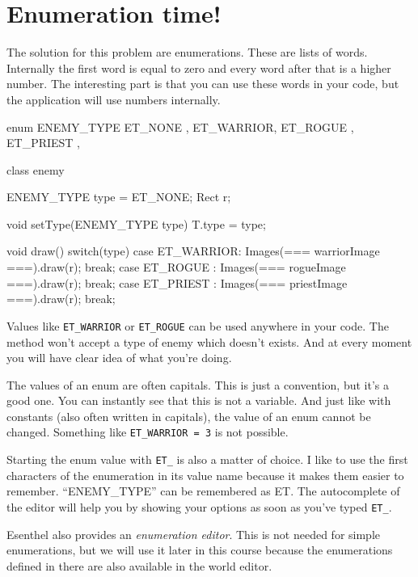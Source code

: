 \section{Enumeration time!}
The solution for this problem are enumerations. These are lists of words. Internally the first word is equal to zero and every word after that is a higher number. The interesting part is that you can use these words in your code, but the application will use numbers internally.

\begin{code}
enum ENEMY_TYPE {
  ET_NONE   ,
  ET_WARRIOR,
  ET_ROGUE  ,
  ET_PRIEST , 
}

class enemy {
  ENEMY_TYPE type = ET_NONE;
	Rect r;
	
	void setType(ENEMY_TYPE type) {
		T.type = type;
	}
	
	void draw() {
		switch(type) {
			case ET_WARRIOR: Images(=== warriorImage ===).draw(r); break;
			case ET_ROGUE  : Images(=== rogueImage   ===).draw(r); break;
			case ET_PRIEST : Images(=== priestImage  ===).draw(r); break;
		}
	}
}
\end{code}
Values like \texttt{ET\_WARRIOR} or \texttt{ET\_ROGUE} can be used anywhere in your code. The method  won't accept a type of enemy which doesn't exists. And at every moment you will have clear idea of what you're doing.

The values of an enum are often capitals. This is just a convention, but it's a good one. You can instantly see that this is not a variable. And just like with constants (also often written in capitals), the value of an enum cannot be changed. Something like \texttt{ET\_WARRIOR = 3} is not possible.

Starting the enum value with \texttt{ET\_} is also a matter of choice. I like to use the first characters of the enumeration in its value name because it makes them easier to remember. ``ENEMY\_TYPE'' can be remembered as ET. The autocomplete of the editor will help you by showing your options as soon as you've typed \texttt{ET\_}.

\begin{note}
Esenthel also provides an \textsl{enumeration editor}. This is not needed for simple enumerations, but we will use it later in this course because the enumerations defined in there are also available in the world editor.
\end{note}


